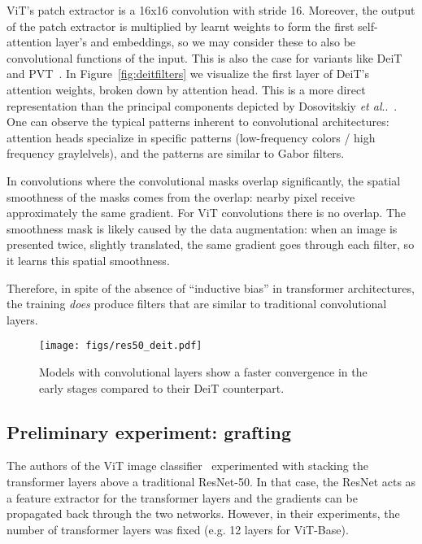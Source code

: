 \documentclass[10pt,twocolumn,letterpaper]{article}
\makeatletter
\DeclareRobustCommand\onedot{\futurelet\@let@token\@onedot}
\def\@onedot{\ifx\@let@token.\else.\null\fi\xspace}
\def\etal{\emph{et al}\onedot}
\makeatother
\begin{document}
ViT's patch extractor is a 16x16 convolution with stride 16. Moreover, the output of the patch extractor is multiplied by learnt weights to form the first self-attention layer's  and  embeddings, so we may consider these to also be convolutional functions of the input. This is also the case for variants like DeiT~\cite{Touvron2021DeiT} and PVT~\cite{wang2021pyramid}. In Figure~\ref{fig:deitfilters} we visualize the first layer of DeiT's attention weights, broken down by attention head.
This is a more direct representation than the principal components depicted by Dosovitskiy \etal~\cite{dosovitskiy2020image}. One can observe the typical patterns inherent to convolutional architectures: attention heads specialize in specific patterns (low-frequency colors / high frequency graylelvels), and the patterns are similar to Gabor filters.

In convolutions where the convolutional masks overlap significantly, the spatial smoothness of the masks comes from the overlap: nearby pixel receive approximately the same gradient.
For ViT convolutions there is no overlap. The smoothness mask is likely caused by the data augmentation: when an image is presented twice, slightly translated, the same gradient goes through each filter, so it learns this spatial smoothness.

Therefore, in spite of the absence of ``inductive bias'' in transformer architectures, the training \emph{does} produce filters that are similar to traditional convolutional layers. 


\begin{figure}[t]
\texttt{[image: figs/res50\_deit.pdf]}
\caption{
	\label{fig:hybrid_convergence} 
	Models with convolutional layers show a faster convergence  in the early stages
 compared to their DeiT counterpart.
}
\end{figure}

\subsection{Preliminary experiment: grafting}

The authors of the ViT image classifier~\cite{dosovitskiy2020image} experimented with stacking the transformer layers above a traditional ResNet-50. 
In that case, the ResNet acts as a feature extractor for the transformer layers and the gradients can be propagated back through the two networks.
However, in their experiments, the number of transformer layers was fixed (e.g. 12 layers for ViT-Base). 
\end{document}
